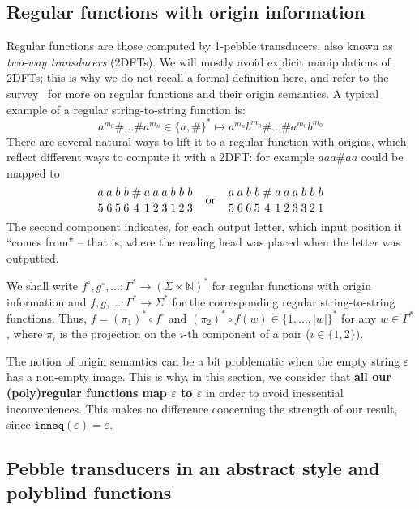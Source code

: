 \documentclass{fundam}
\newcommand{\bbN}{\mathbb{N}}
\newcommand{\worig}{\genfrac{}{}{0pt}{}}
\theoremstyle{claimstyle}
\newcommand\innsq{\mathtt{innsq}}
\begin{document}
\subsection{Regular functions with origin information}
\label{sec:reg-origins}

Regular functions are those computed by 1-pebble transducers, also known as
\emph{two-way transducers} (2DFTs). We will mostly avoid explicit manipulations
of 2DFTs; this is why we do not recall a formal definition here, and refer to the
survey~\cite{MuschollPuppis} for more on regular functions and their origin
semantics. A typical example of a regular string-to-string function is:
\[ a^{m_0}\# \dots \# a^{m_n} \in \{a,\#\}^* \mapsto a^{m_n} b^{m_n} \# \dots \# a^{m_0} b^{m_0} \]
There are several natural ways to lift it to a regular function with origins, which reflect different ways to compute it with a 2DFT: for example $aaa\#aa$ could be mapped to
\begin{align*}
  \worig{a}{5}\worig{a}{6}\worig{b}{5}\worig{b}{6}
  \worig{\#}{4}
  \worig{a}{1}\worig{a}{2}\worig{a}{3}\worig{b}{1}\worig{b}{2}\worig{b}{3}
  \quad\text{or}\quad
  \worig{a}{5}\worig{a}{6}\worig{b}{6}\worig{b}{5}
  \worig{\#}{4}
  \worig{a}{1}\worig{a}{2}\worig{a}{3}\worig{b}{3}\worig{b}{2}\worig{b}{1}
  \end{align*}
The second component indicates, for each output letter, which input position it
\enquote{comes from} -- that is, where the reading head was placed when the
letter was outputted.

We shall write $f^\circ,g^\circ,\ldots \colon \Gamma^* \to (\Sigma\times\bbN)^*$ for regular functions with origin information and $f,g,\ldots \colon \Gamma^* \to \Sigma^*$ for the corresponding regular string-to-string functions. Thus, $f = (\pi_1)^* \circ f^\circ$ and $(\pi_2)^* \circ f(w) \in \{1,\dots,|w|\}^*$ for any $w\in\Gamma^*$, where $\pi_i$ is the projection on the $i$-th component of a pair ($i \in \{1,2\}$).

\begin{remark}
  The notion of origin semantics can be a bit problematic when the empty string
  $\varepsilon$ has a non-empty image. This is why, in this section, we consider
  that \textbf{all our (poly)regular functions map $\varepsilon$ to
    $\varepsilon$} in order to avoid inessential inconveniences. This makes no
  difference concerning the strength of our result, since
  $\innsq(\varepsilon)=\varepsilon$.
\end{remark}

\subsection{Pebble transducers in an abstract style and polyblind functions}
\label{sec:pebble-def}
\end{document}
